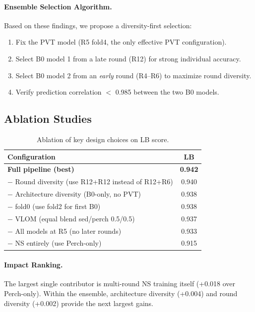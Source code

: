 \documentclass[a4paper]{article}
\begin{document}
\paragraph{Ensemble Selection Algorithm.}
Based on these findings, we propose a diversity-first selection:
\begin{enumerate}[nosep]
    \item Fix the PVT model (R5 fold4, the only effective PVT configuration).
    \item Select B0 model 1 from a late round (R12) for strong individual accuracy.
    \item Select B0 model 2 from an \emph{early} round (R4--R6) to maximize round diversity.
    \item Verify prediction correlation $<$ 0.985 between the two B0 models.
\end{enumerate}

\subsection{Ablation Studies}

\begin{table}[t]
\centering
\caption{Ablation of key design choices on LB score.}
\label{tab:ablation}
\small
\begin{tabular}{lc}
\toprule
Configuration & LB \\
\midrule
\textbf{Full pipeline (best)} & \textbf{0.942} \\
\quad $-$ Round diversity (use R12+R12 instead of R12+R6) & 0.940 \\
\quad $-$ Architecture diversity (B0-only, no PVT) & 0.938 \\
\quad $-$ fold0 (use fold2 for first B0) & 0.938 \\
\quad $-$ VLOM (equal blend sed/perch 0.5/0.5) & 0.937 \\
\quad $-$ All models at R5 (no later rounds) & 0.933 \\
\quad $-$ NS entirely (use Perch-only) & 0.915 \\
\bottomrule
\end{tabular}
\end{table}

\paragraph{Impact Ranking.}
The largest single contributor is multi-round NS training itself (+0.018 over Perch-only).
Within the ensemble, architecture diversity (+0.004) and round diversity (+0.002) provide the next largest gains.
\end{document}
